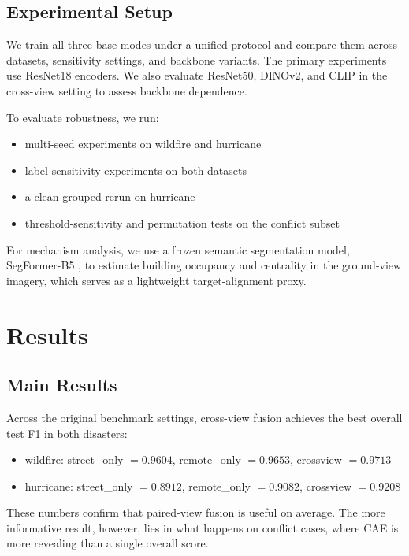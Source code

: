 \documentclass[sigconf]{acmart}
\begin{document}
\subsection{Experimental Setup}

We train all three base modes under a unified protocol and compare them across
datasets, sensitivity settings, and backbone variants. The primary experiments
use ResNet18 encoders. We also evaluate ResNet50, DINOv2, and CLIP in the
cross-view setting to assess backbone dependence.

To evaluate robustness, we run:
\begin{itemize}
  \item multi-seed experiments on wildfire and hurricane
  \item label-sensitivity experiments on both datasets
  \item a clean grouped rerun on hurricane
  \item threshold-sensitivity and permutation tests on the conflict subset
\end{itemize}

For mechanism analysis, we use a frozen semantic segmentation model,
SegFormer-B5 \cite{xie2021segformer}, to estimate building occupancy and
centrality in the ground-view imagery, which serves as a lightweight
target-alignment proxy.

\section{Results}

\subsection{Main Results}

Across the original benchmark settings, cross-view fusion achieves the best
overall test F1 in both disasters:
\begin{itemize}
  \item wildfire: street\_only $= 0.9604$, remote\_only $= 0.9653$,
  crossview $= 0.9713$
  \item hurricane: street\_only $= 0.8912$, remote\_only $= 0.9082$,
  crossview $= 0.9208$
\end{itemize}

These numbers confirm that paired-view fusion is useful on average. The more
informative result, however, lies in what happens on conflict cases, where CAE
is more revealing than a single overall score.
\end{document}
